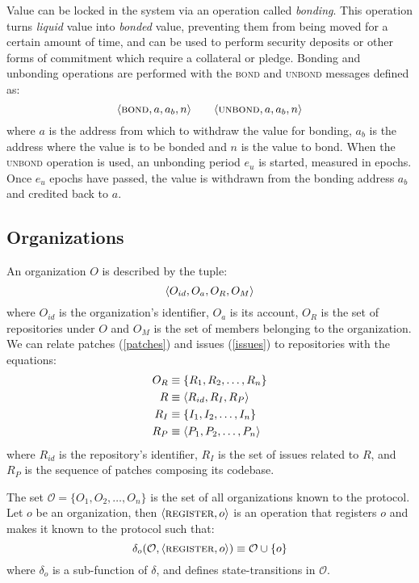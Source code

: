 Value can be locked in the system via an operation called \emph{bonding}.
This operation turns \emph{liquid} value into \emph{bonded} value, preventing
them from being moved for a certain amount of time, and can be used to perform
security deposits or other forms of commitment which require a collateral or
pledge. Bonding and unbonding operations are performed with the
\textsc{bond} and \textsc{unbond} messages defined as:
\[
    \tx{bond}{a, a_b, n} \qquad \tx{unbond}{a, a_b, n}
    \medskip
\]
where $a$ is the address from which to withdraw the value for bonding, $a_b$ is
the address where the value is to be bonded and $n$ is the value to bond. When
the \textsc{unbond} operation is used, an unbonding period $e_u$ is started,
measured in epochs. Once $e_{u}$ epochs have passed, the value is withdrawn
from the bonding address $a_b$ and credited back to $a$.

\subsection{Organizations}
\label{orgs}

An organization $O$ is described by the tuple:
\[
    \langle O_{id}, O_{a}, O_R, O_M \rangle
\]
where $O_{id}$ is the organization's identifier, $O_a$ is its account, $O_R$ is
the set of repositories under $O$ and $O_M$ is the set of members belonging to
the organization. We can relate patches (\ref{patches}) and issues
(\ref{issues}) to repositories with the equations:
\begin{align*}
    O_R & \equiv \{R_1, R_2, \dots, R_n\}         \\
    R   & \equiv \langle R_{id}, R_I, R_P \rangle         \\
    R_I & \equiv \{I_1, I_2, \dots, I_n\}         \\
    R_P & \equiv \langle P_1, P_2, \dots, P_n \rangle
\end{align*}
where $R_{id}$ is the repository's identifier, $R_I$ is the set of issues
related to $R$, and $R_P$ is the sequence of patches composing its codebase.

The set $\mathcal{O} = \{O_1, O_2, \dots, O_n\}$ is the set of all organizations
known to the protocol.  Let $o$ be an organization, then $\langle \text{\normalfont\scshape register}, o \rangle$ is
an operation that registers $o$ and makes it known to the protocol such that:
\[
    \delta_o(\mathcal{O}, \langle \text{\normalfont\scshape register}, o \rangle)
    \equiv \mathcal{O} \cup \{o\}
\]
where $\delta_o$ is a sub-function of $\delta$, and defines state-transitions
in $\mathcal{O}$.


